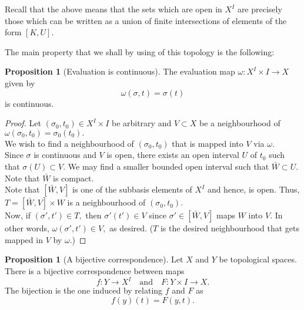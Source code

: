 \documentclass[12pt]{article}
\theoremstyle{definition}
\numberwithin{thm}{section}
\newtheorem{prop}[thm]{Proposition}
\begin{document}
Recall that the above means that the sets which are open in $X^I$ are precisely those which can be written as a union of finite intersections of elements of the form $[K, U].$ 

The main property that we shall by using of this topology is the following:

\begin{prop}[Evaluation is continuous]
	The evaluation map $\omega:X^I \times I \to X$ given by
	\begin{equation*} 
		\omega(\sigma, t) = \sigma(t)
	\end{equation*}
	is continuous.
\end{prop}

\begin{proof} 
	Let $(\sigma_0, t_0) \in X^I\times I$ be arbitrary and $V \subset X$ be a neighbourhood of $\omega(\sigma_0, t_0) = \sigma_0(t_0).$\\
	We wish to find a neighbourhood of $(\sigma_0, t_0)$ that is mapped into $V$ via $\omega.$\\
	Since $\sigma$ is continuous and $V$ is open, there exists an open interval $U$ of $t_0$ such that $\sigma(U) \subset V.$ We may find a smaller bounded open interval such that $\bar{W} \subset U.$ Note that $\bar{W}$ is compact. \\
	Note that $[\bar{W}, V]$ is one of the subbasis elements of $X^I$ and hence, is open. Thus, $T = [\bar{W}, V]\times W$ is a neighbourhood of $(\sigma_0, t_0).$\\
	Now, if $(\sigma', t') \in T,$ then $\sigma'(t') \in V$ since $\sigma' \in [\bar{W}, V]$ maps $W$ into $V.$ In other words, $\omega(\sigma', t') \in V,$ as desired. ($T$ is the desired neighbourhood that gets mapped in $V$ by $\omega.$)
\end{proof}

\begin{prop}[A bijective correspondence]
	Let $X$ and $Y$ be topological spaces. There is a bijective correspondence between maps
	\begin{equation*} 
		f:Y\to X^I \quad \text{and} \quad F:Y\times I \to X.
	\end{equation*}
	The bijection is the one induced by relating $f$ and $F$ as
	\begin{equation*} 
		f(y)(t) = F(y, t).
	\end{equation*}
\end{prop}
\end{document}
